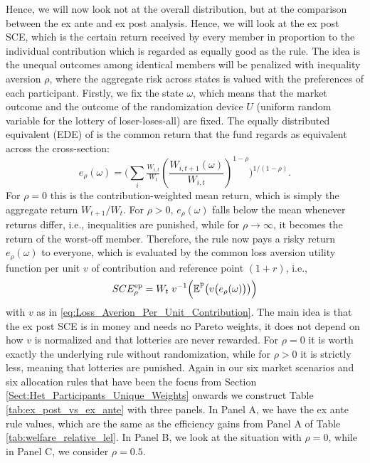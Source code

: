 Hence, we will now look not at the overall distribution, but at the comparison between the ex ante and ex post analysis. Hence, we will look at the ex post SCE, which is the certain return received by every member in proportion to the individual contribution which is regarded as equally good as the rule. The idea is the unequal outcomes among identical members will be penalized with inequality aversion $\rho$, where the aggregate risk across states is valued with the preferences of each participant. Firstly, we fix the state $\omega$, which means that the market outcome and the outcome of the randomization device $U$ (uniform random variable for the lottery of loser-loses-all) are fixed. The equally distributed equivalent (EDE) of \citet{Atkinson_1970} is the common return that the fund regards as equivalent across the cross-section:
\begin{equation}
    e_\rho(\omega)=\Big(\sum_i \tfrac{W_{i,t}}{W_t} \left( \frac{W_{i,t+1}(\omega)}{W_{i,t}}\right)^{1-\rho}\Big)^{1/(1-\rho)}.
\end{equation}
For $\rho=0$ this is the contribution-weighted mean return, which is simply the aggregate return $W_{t+1}/W_t$. For $\rho>0$, $e_\rho(\omega)$ falls below the mean whenever returns differ, i.e., inequalities are punished, while for $\rho \to \infty$, it becomes the return of the worst-off member. Therefore, the rule now pays a risky return $e_\rho(\omega)$ to everyone, which is evaluated by the common loss aversion utility function per unit $v$ of contribution and reference point $(1+r)$, i.e.,
\begin{equation}
    SCE^{\text{ep}}_\rho=W_t\;v^{-1}\Big(\mathbb{E}^{\mathbb{P}}\big(v\big(e_\rho(\omega)\big)\big)\Big)
\end{equation}
with $v$ as in \eqref{eq:Loss_Averion_Per_Unit_Contribution}. The main idea is that the ex post SCE is in money and needs no Pareto weights, it does not depend on how $v$ is normalized and that lotteries are never rewarded. For $\rho=0$ it is worth exactly the underlying rule without randomization, while for $\rho>0$ it is strictly less, meaning that lotteries are punished. Again in our six market scenarios and six allocation rules that have been the focus from Section \ref{Sect:Het_Participants_Unique_Weights} onwards we construct Table \ref{tab:ex_post_vs_ex_ante} with three panels. In Panel A, we have the ex ante rule values, which are the same as the efficiency gains from Panel A of Table \ref{tab:welfare_relative_lel}. In Panel B, we look at the situation with $\rho=0$, while in Panel C, we consider $\rho=0.5$.
